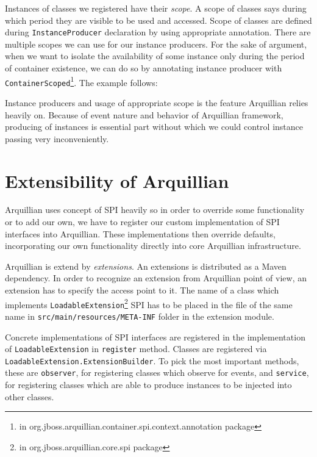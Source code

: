\documentclass[12pt,final,oneside]{fithesis}
\begin{document}
Instances of classes we registered have their \textit{scope}. A scope of classes says during which period they are visible to be used and accessed. Scope of classes are defined during \texttt{InstanceProducer} declaration by using appropriate annotation. There are multiple scopes we can use for our instance producers. For the sake of argument, when we want to isolate the availability of some instance only during the period of container existence, we can do so by annotating instance producer with \texttt{ContainerScoped}\footnote{in org.jboss.arquillian.container.spi.context.annotation package}. The example follows:



Instance producers and usage of appropriate scope is the feature Arquillian relies heavily on. Because of event nature and behavior of Arquillian framework, producing of instances is essential part without which we could control instance passing very inconveniently.

	\section{Extensibility of Arquillian}

Arquillian uses concept of SPI heavily so in order to override some functionality or to add our own, we have to register our custom implementation of SPI interfaces into Arquillian. These implementations then override defaults, incorporating our own functionality directly into core Arquillian infrastructure.

Arquillian is extend by \textit{extensions}. An extensions is distributed as a Maven dependency. In order to recognize an extension from Arquillian point of view, an extension has to specify the access point to it. The name of a class which implements \texttt{LoadableExtension}\footnote{in org.jboss.arquillian.core.spi package} SPI has to be placed in the file of the same name in \texttt{src/main/resources/META-INF} folder in the extension module.

Concrete implementations of SPI interfaces are registered in the implementation of \texttt{LoadableExtension} in \texttt{register} method. Classes are registered via \texttt{LoadableExtension.ExtensionBuilder}. To pick the most important methods, these are \texttt{observer}, for registering classes which observe for events, and \texttt{service}, for registering classes which are able to produce instances to be injected into other classes.
\end{document}
